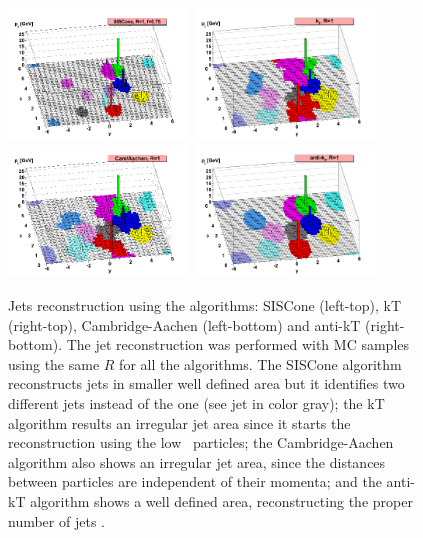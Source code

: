 \begin{figure}[ht]
  \begin{center}
    \includegraphics[width=0.43\textwidth]{figuras/Chapter3/herwig-parton-level-ev-siscone-R1-0-f0-75-ghosted4root.png}
    \includegraphics[width=0.43\textwidth]{figuras/Chapter3/herwig-parton-level-ev-kt-R1-0-ghosted4root.png}
    \includegraphics[width=0.43\textwidth]{figuras/Chapter3/herwig-parton-level-ev-cam-R1-0-ghosted4root.png}
    \includegraphics[width=0.43\textwidth]{figuras/Chapter3/herwig-parton-level-ev-antikt-R1-0-ghosted4root.png}
    \caption{Jets reconstruction using the algorithms: SISCone (left-top), kT (right-top), Cambridge-Aachen 
    (left-bottom) and anti-kT (right-bottom). The jet reconstruction was performed with MC samples using the same $R$
    for all the algorithms. The SISCone algorithm reconstructs jets in smaller well defined area 
   but it identifies two different jets instead of the one (see jet in color gray); the kT algorithm results an 
   irregular jet area since it starts the reconstruction using the low \pt~particles; the Cambridge-Aachen 
   algorithm also shows an irregular jet area, since the distances between particles are 
   independent of their momenta; and the anti-kT algorithm shows a well defined area, reconstructing 
   the proper number of jets \cite{Cambrigdealgorithm}.} \label{fig:JetsAlgos}
  \end{center}
\end{figure}
 
